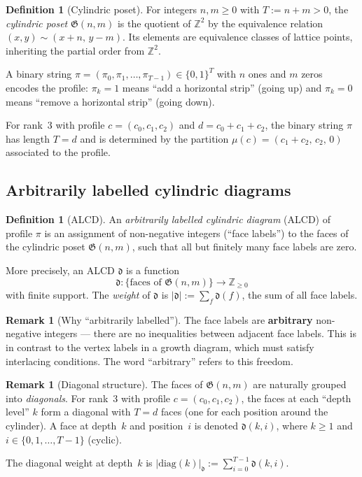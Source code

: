 \documentclass[11pt]{article}
\newcommand{\Z}{\mathbb{Z}}
\theoremstyle{plain}
\theoremstyle{definition}
\newtheorem{definition}[theorem]{Definition}
\newtheorem{remark}[theorem]{Remark}
\begin{document}
\begin{definition}[Cylindric poset]
\label{def:cyl-poset}
For integers $n, m \geq 0$ with $T := n + m > 0$, the
\emph{cylindric poset} $\mathfrak{G}(n,m)$ is the quotient of $\Z^2$
by the equivalence relation $(x, y) \sim (x + n,\, y - m)$.  Its
elements are equivalence classes of lattice points, inheriting the
partial order from $\Z^2$.
\end{definition}

A binary string $\pi = (\pi_0, \pi_1, \ldots, \pi_{T-1}) \in \{0,1\}^T$
with $n$ ones and $m$ zeros encodes the profile: $\pi_k = 1$ means
``add a horizontal strip'' (going up) and $\pi_k = 0$ means ``remove
a horizontal strip'' (going down).

For rank~3 with profile $c = (c_0, c_1, c_2)$ and $d = c_0 + c_1 + c_2$,
the binary string $\pi$ has length $T = d$ and is determined by the
partition $\mu(c) = (c_1 + c_2,\, c_2,\, 0)$ associated to the profile.


\subsection{Arbitrarily labelled cylindric diagrams}

\begin{definition}[ALCD]
\label{def:alcd}
An \emph{arbitrarily labelled cylindric diagram} (ALCD) of profile $\pi$
is an assignment of non-negative integers (``face labels'') to the faces
of the cylindric poset $\mathfrak{G}(n,m)$, such that all but finitely
many face labels are zero.

More precisely, an ALCD $\mathfrak{d}$ is a function
\[
  \mathfrak{d}\colon \{\text{faces of } \mathfrak{G}(n,m)\} \to \Z_{\geq 0}
\]
with finite support.  The \emph{weight} of $\mathfrak{d}$ is
$|\mathfrak{d}| := \sum_f \mathfrak{d}(f)$, the sum of all face labels.
\end{definition}

\begin{remark}[Why ``arbitrarily labelled'']
The face labels are \textbf{arbitrary} non-negative integers --- there
are no inequalities between adjacent face labels.  This is in contrast
to the vertex labels in a growth diagram, which must satisfy interlacing
conditions.  The word ``arbitrary'' refers to this freedom.
\end{remark}

\begin{remark}[Diagonal structure]
\label{rem:diagonals}
The faces of $\mathfrak{G}(n,m)$ are naturally grouped into
\emph{diagonals}.  For rank~3 with profile $c = (c_0, c_1, c_2)$, the
faces at each ``depth level'' $k$ form a diagonal with $T = d$ faces
(one for each position around the cylinder).  A face at depth~$k$ and
position~$i$ is denoted $\mathfrak{d}(k, i)$, where $k \geq 1$ and
$i \in \{0, 1, \ldots, T-1\}$ (cyclic).

The diagonal weight at depth~$k$ is
$|\mathrm{diag}(k)|_{\mathfrak{d}} := \sum_{i=0}^{T-1} \mathfrak{d}(k,i)$.
\end{remark}
\end{document}
